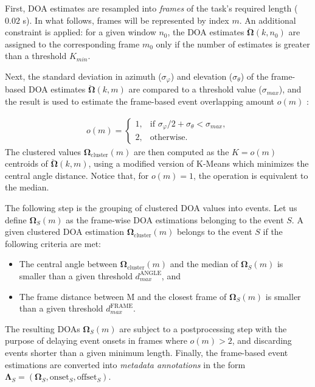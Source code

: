 First, DOA estimates are resampled into \textit{frames} of the task's required length ($0.02$ s). In what follows, frames will be represented by index $m$. 
An additional constraint is applied: for a given window $n_0$, the DOA estimates $\breve{\pmb{\Omega}}(k,n_0)$ are assigned to the corresponding frame $m_0$ only if the number of estimates is greater than a threshold $K_{min}$.

Next, the standard deviation in azimuth ($\sigma_{\varphi}$) and elevation ($\sigma_{\theta} $) of the frame-based DOA estimates $\breve{\pmb{\Omega}}(k,m)$ are compared to a threshold value ($\sigma_{max}$), and the result is used to estimate the frame-based event overlapping amount $o(m)$ :

\begin{equation}
\begin{aligned}
	o(m) =  \begin{cases}
    		1, &\text{if } \sigma_{\varphi}/2 + \sigma_{\theta} < \sigma_{max},\\
    		2, &\text{otherwise}.
    \end{cases}    		
\end{aligned}
\end{equation}
The clustered values $\pmb{\Omega}_{\text{cluster}}(m)$ are then computed as the $K=o(m)$ centroids of $\breve{\pmb{\Omega}}(k,m)$, using a modified version of K-Means which minimizes the central angle distance. Notice that, for $o(m)=1$, the operation is equivalent to the median.

The following step is the grouping of clustered DOA values into events.
Let us define $\pmb{\Omega}_S(m)$ as the frame-wise DOA estimations belonging to the event $S$. A given clustered DOA estimation $\pmb{\Omega}_{\text{cluster}}(m)$ belongs to the event $S$ if the following criteria are met:
\begin{itemize}
    \item The central angle between  $\pmb{\Omega}_{\text{cluster}}(m)$ and the median of $\pmb{\Omega}_S(m)$ is smaller than a given threshold $d_{max}^\text{ANGLE}$, and
    \item The frame distance between M and the closest frame of $\pmb{\Omega}_S(m)$ is smaller than a given threshold $d_{max}^\text{FRAME}$.
\end{itemize}

The resulting DOAs $\pmb{\Omega}_S(m)$ are subject to a postprocessing step with the purpose of 
delaying event onsets in frames where $o(m) > 2$, and discarding events shorter than a given minimum length. 
Finally, the frame-based event estimations are converted into \textit{metadata annotations} in the form $\pmb{\Lambda}_S = (\pmb{\Omega}_S, \text{onset}_S, \text{offset}_S)$.

